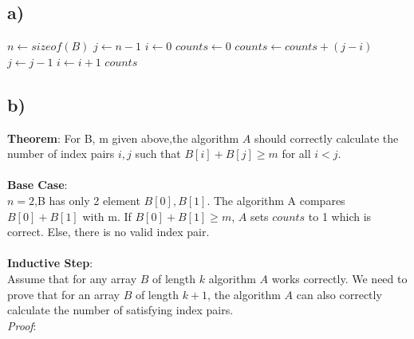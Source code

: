 \documentclass[12pt]{article}
\begin{document}
\subsection*{a)}
\begin{algorithm}
    \begin{algorithmic}[1]
        \State $n \gets sizeof(B)$
        \State $j \gets n - 1$
        \State $i \gets 0$
        \State $counts \gets 0$
                \State $counts \gets counts + (j - i)$
                \State $j \gets j - 1$
            \Else
                \State $i \gets i + 1$
            \EndIf
        \EndWhile
        \State \Return $counts$
    \EndFunction
    \end{algorithmic}
\end{algorithm}



\subsection*{b)}
\textbf{Theorem}: For B, m given above,the algorithm $A$ should correctly
calculate the number of index pairs $i, j$ such that $B[i] + B[j] \geq m$
for all $i < j$.\\\\
\textbf{Base Case}: \\
$n = 2$,B has only 2 element $B[0], B[1]$. The algorithm A compares $B[0]
+ B[1]$ with m. If $B[0] + B[1] \geq m$, $A$ sets $counts$ to 1 which is 
correct. Else, there is no valid index pair.\\\\
\textbf{Inductive Step}:\\
Assume that for any array $B$ of length $k$ algorithm $A$ works correctly.
We need to prove that for an array $B$ of length $k+1$, the algorithm $A$
can also correctly calculate the number of satisfying index pairs.\\
\textit{Proof}:
\end{document}
